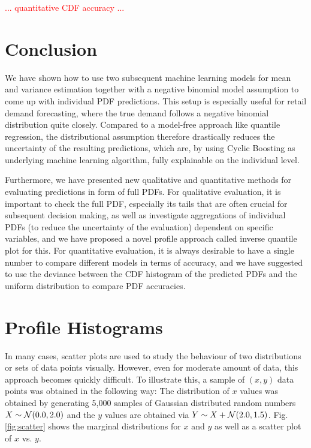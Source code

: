 \documentclass[BCOR=1mm, DIV=calc,10pt,
twoside=true,
twocolumn,
headings=normal]{scrartcl}
\newcommand{\fig}{Fig. }
\begin{document}
\textcolor{red}{... quantitative CDF accuracy ...}


\section{Conclusion}

We have shown how to use two subsequent machine learning models for mean and variance estimation together with a negative binomial model assumption to come up with individual PDF predictions. This setup is especially useful for retail demand forecasting, where the true demand follows a negative binomial distribution quite closely. Compared to a model-free approach like quantile regression, the distributional assumption therefore drastically reduces the uncertainty of the resulting predictions, which are, by using Cyclic Boosting as underlying machine learning algorithm, fully explainable on the individual level.

Furthermore, we have presented new qualitative and quantitative methods for evaluating predictions in form of full PDFs. For qualitative evaluation, it is important to check the full PDF, especially its tails that are often crucial for subsequent decision making, as well as investigate aggregations of individual PDFs (to reduce the uncertainty of the evaluation) dependent on specific variables, and we have proposed a novel profile approach called inverse quantile plot for this. For quantitative evaluation, it is always desirable to have a single number to compare different models in terms of accuracy, and we have suggested to use the deviance between the CDF histogram of the predicted PDFs and the uniform distribution to compare PDF accuracies.





\appendix

\section{Profile Histograms}

In many cases, scatter plots are used to study the behaviour of two distributions or sets of data points visually. However, even for moderate amount of data, this approach becomes quickly difficult. To illustrate this, a sample of $(x,y)$ data points was obtained in the following way: The distribution of $x$ values was obtained by generating 5,000 samples of Gaussian distributed random numbers $X \sim {\cal N}(0.0,2.0)$ and the $y$ values are obtained via $Y \sim X +  {\cal N}(2.0,1.5)$. \fig \ref{fig:scatter} shows the marginal distributions for $x$ and $y$ as well as a scatter plot of $x$ vs. $y$.
\end{document}
